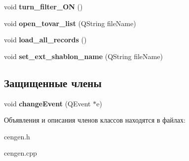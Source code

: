 \begin{DoxyCompactItemize}
\item 
\hypertarget{classcengen_a67e90992315adf02f7231370b253679e}{void {\bfseries turn\-\_\-filter\-\_\-\-O\-N} ()}\label{classcengen_a67e90992315adf02f7231370b253679e}

\item 
\hypertarget{classcengen_ab89eb4262272e7f05f7026258778f1a9}{void {\bfseries open\-\_\-tovar\-\_\-list} (\-Q\-String file\-Name)}\label{classcengen_ab89eb4262272e7f05f7026258778f1a9}

\item 
\hypertarget{classcengen_a588883a5e50b6a30152c3191e81da7cc}{void {\bfseries load\-\_\-all\-\_\-records} ()}\label{classcengen_a588883a5e50b6a30152c3191e81da7cc}

\item 
\hypertarget{classcengen_a6331e74c5c9597a85a1e23f3d05b8827}{void {\bfseries set\-\_\-ext\-\_\-shablon\-\_\-name} (\-Q\-String file\-Name)}\label{classcengen_a6331e74c5c9597a85a1e23f3d05b8827}

\end{DoxyCompactItemize}
\subsection*{Защищенные члены}
\begin{DoxyCompactItemize}
\item 
\hypertarget{classcengen_a404ebcd550c649de12e892514d5c25de}{void {\bfseries change\-Event} (\-Q\-Event $\ast$e)}\label{classcengen_a404ebcd550c649de12e892514d5c25de}

\end{DoxyCompactItemize}


Объявления и описания членов классов находятся в файлах\-:\begin{DoxyCompactItemize}
\item 
cengen.\-h\item 
cengen.\-cpp\end{DoxyCompactItemize}
